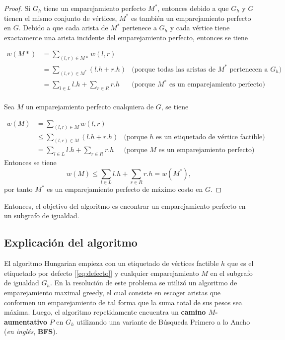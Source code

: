 \documentclass[10pt]{article} %
\begin{document}
\begin{proof}
	Si $G_h$ tiene un emparejamiento perfecto $M^*$, entonces debido a que $G_h$ y $G$ tienen el mismo conjunto de v\'ertices, $M^*$ es tambi\'en un emparejamiento perfecto en $G$. Debido a que cada arista de $M^*$ pertenece a $G_h$ y cada v\'ertice tiene exactamente una arista incidente del emparejamiento perfecto, entonces se tiene
	
	\begin{align}
		w(M*) &= \sum_{(l,r) \in M*} w(l,r)\\
		&= \sum_{(l,r) \in M^*}(l.h + r.h) &\text{(porque todas las aristas de $M^*$ pertenecen a $G_h$)}\\
		&= \sum_{l \in L}l.h + \sum_{r \in R} r.h &\text{(porque $M^{*}$ es un emparejamiento perfecto)}\\
	\end{align} 
	
	Sea $M$ un emparejamiento perfecto cualquiera de $G$, se tiene
	
	\begin{align}
		w(M) &= \sum_{(l,r) \in M} w(l,r)\\
		&\leq \sum_{(l,r) \in M} (l.h + r.h) &\text{(porque $h$ es un etiquetado de v\'ertice factible)}\\
		&= \sum_{l \in L} l.h + \sum_{r \in R} r.h &\text{(porque $M$ es un emparejamiento perfecto)}
	\end{align}
	Entonces se tiene
	\begin{equation}
		w(M) \leq \sum_{l \in L} l.h + \sum_{r \in R} r.h = w(M^*),
	\end{equation}
	por tanto $M^*$ es un emparejamiento perfecto de m\'aximo costo en $G$.
\end{proof}

Entonces, el objetivo del algoritmo es encontrar un emparejamiento perfecto en un subgrafo de igualdad. 

\subsection{Explicaci\'on del algoritmo}


El algoritmo Hungarian empieza con un etiquetado de v\'ertices factible $h$ que es el etiquetado por defecto [\ref{eq:defecto}] y cualquier emparejamiento $M$ en el subgrafo de igualdad $G_h$.  En la resoluci\'on de este problema se utiliz\'o un algoritmo de emparejamiento maximal greedy, el cual consiste en escoger aristas que conformen un emparejamiento de tal forma que la suma total de sus pesos  sea m\'axima. Luego, el algoritmo repetidamente encuentra un \textbf{camino $M$-aumentativo} $P$ en $G_h$ utilizando una variante de B\'usqueda Primero a lo Ancho (\textit{en ingl\'es}, \textbf{BFS}). 
\end{document}

